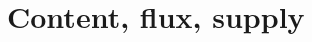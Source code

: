 \documentclass[a4paper,12pt,%
onecolumn,oneside,%
british%
]{memoir}
\renewcommand*{\|}[1][]{\nonscript\:#1\vert\nonscript\:\mathopen{}}
\begin{document}




















\printpagenotes*
\cleartooddpage
\chapter{Content, flux, supply}
\label{cha:contents_fluxes}
\setcounter{section}{-1}
\end{document}
